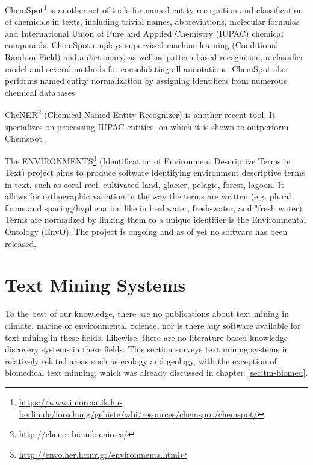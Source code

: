 ChemSpot\footnote{\url{https://www.informatik.hu-berlin.de/forschung/gebiete/wbi/resources/chemspot/chemspot/}} is another set of tools for named entity recognition and classification of chemicals in texts, including trivial names, abbreviations, molecular formulas and International Union of Pure and Applied Chemistry (IUPAC) chemical compounds. 
ChemSpot employs supervised-machine learning (Conditional Random Field) and a dictionary, as well as pattern-based recognition, a classifier model and several methods for consolidating all annotations. 
ChemSpot also performs named entity normalization by assigning identifiers from numerous chemical databases. 

CheNER\footnote{\url{http://chener.bioinfo.cnio.es/}} (Chemical Named Entity Recognizer) is another recent tool. It specializes on processing IUPAC entities, on which it is shown to outperform Chemspot \citep{Usie2014CheNER}.

The ENVIRONMENTS\footnote{\url{http://envo.her.hcmr.gr/environments.html}} (Identification of Environment Descriptive Terms in Text) project aims to produce software identifying environment descriptive terms in text, such as coral reef, cultivated land, glacier, pelagic, forest, lagoon.
It allows for orthographic variation in the way the terms are written (e.g. plural forms and spacing/hyphenation like in freshwater, fresh-water, and "fresh water).
Terms are normalized by linking them to a unique identifier is the Environmental Ontology (EnvO).
The project is ongoing and as of yet no software has been released.

\section{Text Mining Systems}

To the best of our knowledge, there are no publications about text mining in climate, marine or environmental Science, nor is there any software available for text mining in these fields.
Likewise, there are no literature-based knowledge discovery systems in these fields.
This section surveys text mining systems in relatively related areas such as ecology and geology, with the exception of biomedical text minning, which was already discussed in chapter~\ref{sec:tm-biomed}.  

